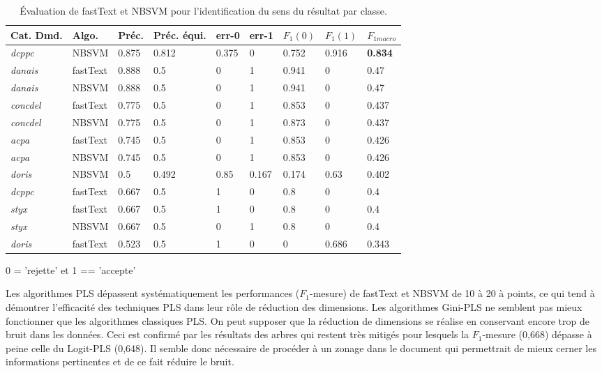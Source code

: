  \begin{table}[htb]
 	\footnotesize 
 	\begin{center}
 	\begin{tabular}{|l|l|l|l|l|l|l|l|l|}
 		\hline
 	\textbf{Cat. Dmd.} & \textbf{Algo.} & \textbf{Préc.} & \textbf{Préc. équi.} & \textbf{err-0} & \textbf{err-1} & $F_1(0)$ & $F_1(1)$ & \textbf{$F_{1macro}$} \\ \hline
 	\textit{dcppc} & NBSVM & 0.875 & 0.812 & 0.375 & 0 & 0.752 & 0.916 & \textbf{0.834} \\ \hline
 	\textit{danais} & fastText & 0.888 & 0.5 & 0 & 1 & 0.941 & 0 & 0.47 \\ \hline
 	\textit{danais} & NBSVM & 0.888 & 0.5 & 0 & 1 & 0.941 & 0 & 0.47 \\ \hline
 	\textit{concdel} & fastText & 0.775 & 0.5 & 0 & 1 & 0.853 & 0 & 0.437 \\ \hline
 	\textit{concdel} & NBSVM & 0.775 & 0.5 & 0 & 1 & 0.873 & 0 & 0.437 \\ \hline
 	\textit{acpa} & fastText & 0.745 & 0.5 & 0 & 1 & 0.853 & 0 & 0.426 \\ \hline
 	\textit{acpa} & NBSVM & 0.745 & 0.5 & 0 & 1 & 0.853 & 0 & 0.426 \\ \hline
 	\textit{doris} & NBSVM & 0.5 & 0.492 & 0.85 & 0.167 & 0.174 & 0.63 & 0.402 \\ \hline
 	\textit{dcppc} & fastText & 0.667 & 0.5 & 1 & 0 & 0.8 & 0 & 0.4 \\ \hline
 	\textit{styx} & fastText & 0.667 & 0.5 & 1 & 0 & 0.8 & 0 & 0.4 \\ \hline
 	\textit{styx} & NBSVM & 0.667 & 0.5 & 0 & 1 & 0.8 & 0 & 0.4 \\ \hline
 	\textit{doris} & fastText & 0.523 & 0.5 & 1 & 0 & 0 & 0.686 & 0.343 \\ \hline
 	\end{tabular}
 \end{center}
 	
 0 = 'rejette' et 1 == 'accepte'

\caption{Évaluation de fastText et NBSVM pour l'identification du sens du résultat par classe.}\label{tab:sensrst:fasttextnbsvm}
 \end{table}

 Les algorithmes PLS dépassent systématiquement les performances ($F_1$-mesure) de fastText et
NBSVM de 10 à 20 à points, ce qui tend à démontrer l'efficacité des techniques PLS dans leur
rôle de réduction des dimensions. Les algorithmes Gini-PLS ne semblent pas mieux
fonctionner que les algorithmes classiques PLS. On peut supposer que la réduction de
dimensions se réalise en conservant encore trop de bruit dans les données. Ceci est confirmé
par les résultats des arbres qui restent très mitigés pour lesquels la $F_1$-mesure (0,668) dépasse à
peine celle du Logit-PLS (0,648). Il semble donc nécessaire de procéder à un zonage dans le
document qui permettrait de mieux cerner les informations pertinentes et de ce fait réduire le
bruit.

